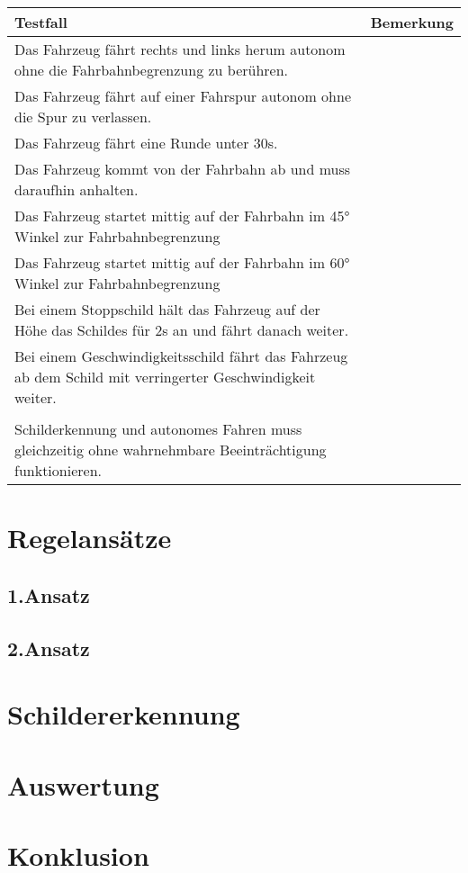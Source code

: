 	\begin{table}[h]
		\renewcommand{\arraystretch}{1.5}
		\begin{tabular}{|p{}|p{}|}
			\hline
			Testfall& Bemerkung\\
			\hline
			Das Fahrzeug f\"ahrt rechts und links herum autonom ohne die Fahrbahnbegrenzung zu ber\"uhren.& \\
			\hline
			Das Fahrzeug f\"ahrt auf einer Fahrspur autonom ohne die Spur zu verlassen. & \\
			\hline
			Das Fahrzeug f\"ahrt eine Runde unter 30s.& \\
			\hline
			Das Fahrzeug kommt von der Fahrbahn ab und muss daraufhin anhalten.& \\
			\hline
			Das Fahrzeug startet mittig auf der Fahrbahn im \ang{45} Winkel zur Fahrbahnbegrenzung & \\
			\hline
			Das Fahrzeug startet mittig auf der Fahrbahn im \ang{60} Winkel zur Fahrbahnbegrenzung& \\
			\hline
			Bei einem Stoppschild h\"alt das Fahrzeug auf der H\"ohe das Schildes f\"ur 2s an und f\"ahrt danach weiter.& \\
			\hline
			Bei einem Geschwindigkeitsschild f\"ahrt das Fahrzeug ab dem Schild mit verringerter Geschwindigkeit weiter.& \\
			\hline
			& \\
			\hline
			Schilderkennung und autonomes Fahren muss gleichzeitig ohne wahrnehmbare Beeintr\"achtigung funktionieren.& \\
			\hline
			
		\end{tabular}
	\end{table}
\clearpage
  
\section{Regelans{\"a}tze}
  
\subsection{1.Ansatz}
  
\subsection{2.Ansatz}
  
\section{Schildererkennung}
  
\section{Auswertung}
  
\section{Konklusion}